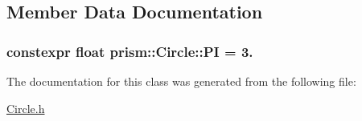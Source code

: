 \subsection{Member Data Documentation}
\subsubsection[{\texorpdfstring{PI}{PI}}]{\setlength{\rightskip}{0pt plus 5cm}constexpr float prism\+::\+Circle\+::\+PI = 3.\hspace{0.3cm}{\ttfamily [static]}}\hypertarget{classprism_1_1_circle_a83124fb14e0f926a977d2b5e6b259bfa}{}\label{classprism_1_1_circle_a83124fb14e0f926a977d2b5e6b259bfa}


The documentation for this class was generated from the following file\+:\begin{DoxyCompactItemize}
\item 
\hyperlink{_circle_8h}{Circle.\+h}\end{DoxyCompactItemize}
